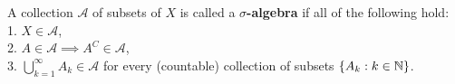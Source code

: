 \begin{definition}
	A collection $\mathscr{A}$ of subsets of $X$ is called a \textbf{$\sigma$-algebra} if all of the following hold:\\1. $X\in \mathscr{A}$,\\2. $A\in \mathscr{A} \implies A^{C}\in \mathscr{A}$,\\
3. $\bigcup _{k=1}^{\infty}A_{k} \in \mathscr{A}$ for every (countable) collection of subsets $\{A_{k} : k \in \mathbb{N} \} $.
\end{definition}
